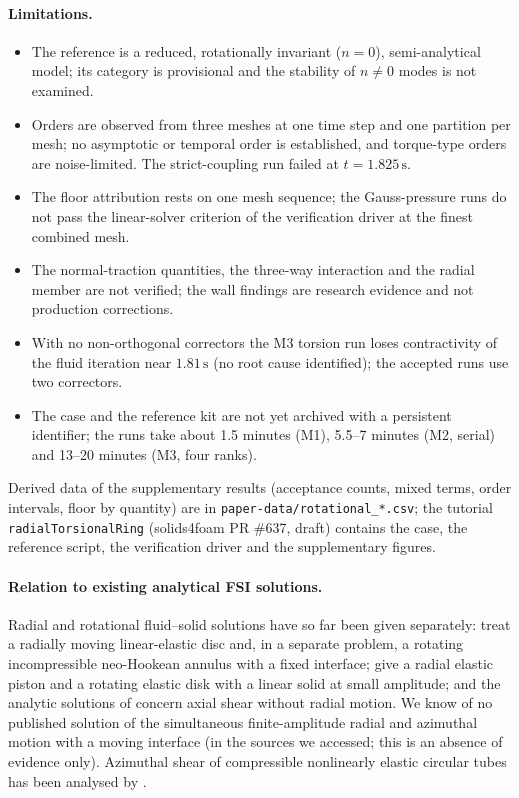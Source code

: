 \paragraph{Limitations.}
\begin{itemize}
	\item The reference is a reduced, rotationally invariant ($n=0$), semi-analytical model; its category is provisional and the stability of $n\neq0$ modes is not examined.
	\item Orders are observed from three meshes at one time step and one partition per mesh; no asymptotic or temporal order is established, and torque-type orders are noise-limited. The strict-coupling run failed at $t=1.825\,\mathrm{s}$.
	\item The floor attribution rests on one mesh sequence; the Gauss-pressure runs do not pass the linear-solver criterion of the verification driver at the finest combined mesh.
	\item The normal-traction quantities, the three-way interaction and the radial member are not verified; the wall findings are research evidence and not production corrections.
	\item With no non-orthogonal correctors the M3 torsion run loses contractivity of the fluid iteration near $1.81\,\mathrm{s}$ (no root cause identified); the accepted runs use two correctors.
	\item The case and the reference kit are not yet archived with a persistent identifier; the runs take about 1.5 minutes (M1), 5.5--7 minutes (M2, serial) and 13--20 minutes (M3, four ranks).
\end{itemize}
Derived data of the supplementary results (acceptance counts, mixed terms, order intervals, floor by quantity) are in \texttt{paper-data/rotational\_*.csv}; the tutorial \texttt{radialTorsionalRing} (solids4foam PR \#637, draft) contains the case, the reference script, the verification driver and the supplementary figures.

\paragraph{Relation to existing analytical FSI solutions.}
Radial and rotational fluid--solid solutions have so far been given separately: \citet{WangPironneau2026} treat a radially moving linear-elastic disc and, in a separate problem, a rotating incompressible neo-Hookean annulus with a fixed interface; \citet{Serino2019} give a radial elastic piston and a rotating elastic disk with a linear solid at small amplitude; and the analytic solutions of \citet{Hessenthaler2020} concern axial shear without radial motion.
We know of no published solution of the simultaneous finite-amplitude radial and azimuthal motion with a moving interface (in the sources we accessed; this is an absence of evidence only).
Azimuthal shear of compressible nonlinearly elastic circular tubes has been analysed by \citet{Polignone1994}.
